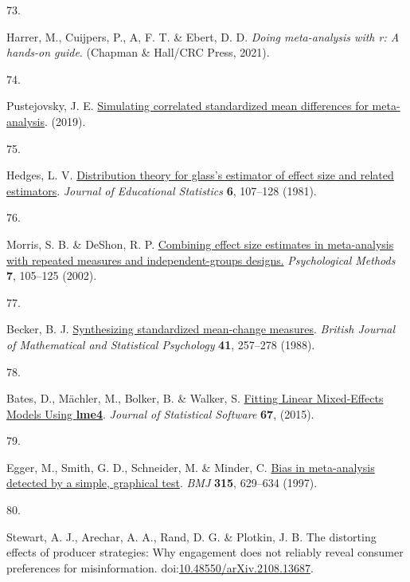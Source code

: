 \documentclass[
  doc,floatsintext]{apa6}
\newlength{\cslhangindent}
\newlength{\csllabelwidth}
\newenvironment{CSLReferences}[2] %
 {\begin{list}{}{%
  \setlength{\itemindent}{0pt}
  \setlength{\leftmargin}{0pt}
  \setlength{\parsep}{0pt}
  \ifodd #1
   \setlength{\leftmargin}{\cslhangindent}
   \setlength{\itemindent}{-1\cslhangindent}
  \fi
  \setlength{\itemsep}{#2\baselineskip}}}
 {\end{list}}
\newcommand{\CSLLeftMargin}[1]{\parbox[t]{\csllabelwidth}{\strut#1\strut}}
\newcommand{\CSLRightInline}[1]{\parbox[t]{\linewidth - \csllabelwidth}{\strut#1\strut}}
\begin{document}
\begin{CSLReferences}{0}{0}
\CSLLeftMargin{73. }%
\CSLRightInline{Harrer, M., Cuijpers, P., A, F. T. \& Ebert, D. D. \emph{Doing meta-analysis with r: A hands-on guide}. (Chapman \& Hall/CRC Press, 2021).}

\CSLLeftMargin{74. }%
\CSLRightInline{Pustejovsky, J. E. \href{https://www.jepusto.com/simulating-correlated-smds/}{Simulating correlated standardized mean differences for meta-analysis}. (2019).}

\CSLLeftMargin{75. }%
\CSLRightInline{Hedges, L. V. \href{https://doi.org/10.3102/10769986006002107}{Distribution theory for glass's estimator of effect size and related estimators}. \emph{Journal of Educational Statistics} \textbf{6}, 107--128 (1981).}

\CSLLeftMargin{76. }%
\CSLRightInline{Morris, S. B. \& DeShon, R. P. \href{https://doi.org/10.1037/1082-989X.7.1.105}{Combining effect size estimates in meta-analysis with repeated measures and independent-groups designs.} \emph{Psychological Methods} \textbf{7}, 105--125 (2002).}

\CSLLeftMargin{77. }%
\CSLRightInline{Becker, B. J. \href{https://doi.org/10.1111/j.2044-8317.1988.tb00901.x}{Synthesizing standardized mean-change measures}. \emph{British Journal of Mathematical and Statistical Psychology} \textbf{41}, 257--278 (1988).}

\CSLLeftMargin{78. }%
\CSLRightInline{Bates, D., Mächler, M., Bolker, B. \& Walker, S. \href{https://doi.org/10.18637/jss.v067.i01}{Fitting Linear Mixed-Effects Models Using {\textbf{lme4}}}. \emph{Journal of Statistical Software} \textbf{67}, (2015).}

\CSLLeftMargin{79. }%
\CSLRightInline{Egger, M., Smith, G. D., Schneider, M. \& Minder, C. \href{https://doi.org/10.1136/bmj.315.7109.629}{Bias in meta-analysis detected by a simple, graphical test}. \emph{BMJ} \textbf{315}, 629--634 (1997).}

\CSLLeftMargin{80. }%
\CSLRightInline{Stewart, A. J., Arechar, A. A., Rand, D. G. \& Plotkin, J. B. The distorting effects of producer strategies: Why engagement does not reliably reveal consumer preferences for misinformation. doi:\href{https://doi.org/10.48550/arXiv.2108.13687}{10.48550/arXiv.2108.13687}.}


\end{CSLReferences}
\end{document}
